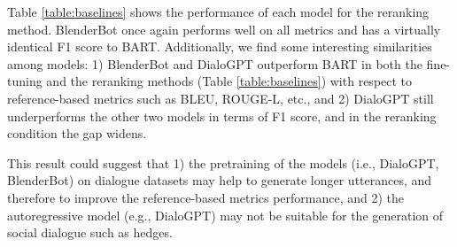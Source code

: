 \documentclass[11pt]{article}
\newcommand{\oneS}{\ensuremath{{}^{\textstyle *}}}
\begin{document}

Table \ref{table:baselines} shows the performance of each model for the reranking method. BlenderBot once again performs well on all metrics and has a virtually identical F1 score to BART. Additionally, we find some interesting similarities among models: 1) BlenderBot and DialoGPT outperform BART in both the fine-tuning and the reranking methods (Table \ref{table:baselines}) with respect to reference-based metrics such as BLEU, ROUGE-L, etc., and 2) DialoGPT still underperforms the other two models in terms of F1 score, and in the reranking condition the gap widens.

This result could suggest that 1) the pretraining of the models (i.e., DialoGPT, BlenderBot) on dialogue datasets may help to generate longer utterances, and therefore to improve the reference-based metrics performance, and 2) the autoregressive model (e.g., DialoGPT) may not be suitable for the generation of social dialogue such as hedges.

\end{document}
